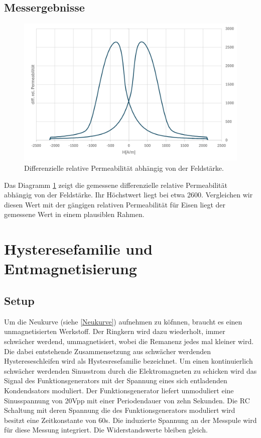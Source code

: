\documentclass[a4paper,twoside,12pt,DIV=13,BCOR=5mm,numbers=noenddot,cleardoublepage=empty]{scrbook}
\begin{document}
\subsection{Messergebnisse}
\begin{figure}
  \centering
  \includegraphics[width=0.9\linewidth]{pictures/Permeabilitaet.png}
  \caption{Differenzielle relative Permeabilit\"at abh\"angig von der Feldst\"arke.}
  \label{fig:perm}
\end{figure}
Das Diagramm \ref{fig:perm} zeigt die gemessene differenzielle relative Permeabilit\"at abh\"angig von der Feldst\"arke. Ihr H\"ochstwert liegt bei etwa  2600. 
Vergleichen wir diesen Wert mit der g\"angigen relativen Permeabilit\"at f\"ur Eisen liegt der gemessene Wert in einem plausiblen Rahmen.

\section{Hysteresefamilie und Entmagnetisierung}
\label{Entmag}
\subsection{Setup}
Um die Neukurve (siehe \ref{Neukurve}) aufnehmen zu k\"ofnnen, braucht es einen unmagnetisierten Werkstoff. 
Der Ringkern wird dazu wiederholt, immer schw\"acher werdend, ummagnetisiert, wobei die Remanenz jedes mal kleiner wird.
Die dabei entstehende Zusammensetzung aus schw\"acher werdenden Hystereseschleifen wird als Hystesresefamilie bezeichnet. 
Um einen kontinuierlich schw\"acher werdenden Sinusstrom durch die Elektromagneten zu schicken wird das Signal des Funktionsgenerators 
mit der Spannung eines sich entladenden Kondendsators moduliert. Der Funktionsgenerator liefert unmoduliert eine Sinusspannung von 20Vpp  mit einer Periodendauer von zehn Sekunden.
Die RC Schaltung mit deren Spannung die des Funktionsgenerators moduliert wird besitzt eine Zeitkonstante von 60s. Die induzierte Spannung an der Messpule wird f\"ur diese Messung integriert. 
Die Widerstandswerte bleiben gleich.
\end{document}
